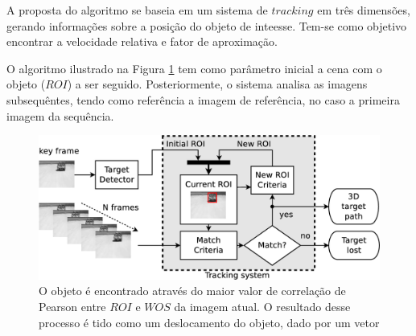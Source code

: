 A proposta do algoritmo se baseia em um sistema de $tracking$ em três dimensões, gerando informações
sobre a posição do objeto de inteesse. Tem-se como objetivo encontrar a velocidade relativa e fator de aproximação.

O algoritmo ilustrado na Figura \ref{fig:system} tem como parâmetro inicial a cena com o
objeto ($ROI$) a ser seguido. Posteriormente, o sistema analisa as imagens subsequêntes, 
tendo como referência a imagem de referência, no caso a primeira imagem da sequência.

\begin{figure}[h]
\includegraphics[width=\columnwidth]{images/figure1-diagram1.eps}
\caption{O objeto é encontrado através do maior valor de correlação de Pearson entre $ROI$ e $WOS$ da imagem atual. 
O resultado desse processo é tido como um deslocamento do objeto, dado por um vetor}
\label{fig:system}
\end{figure}

